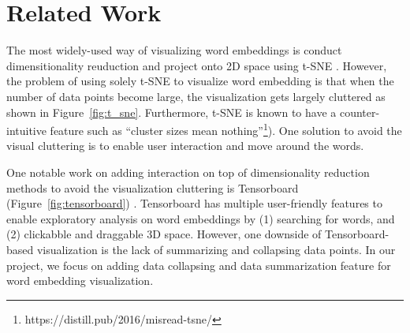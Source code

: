 \section{Related Work}
The most widely-used way of visualizing word embeddings is conduct dimensitionality reuduction and project onto 2D space using t-SNE \cite{t-sne}. 
However, the problem of using solely t-SNE to visualize word embedding is that when the number of data points become large, the visualization gets largely cluttered as shown in Figure~\ref{fig:t_sne}. 
Furthermore, t-SNE is known to have a counter-intuitive feature such as ``cluster sizes mean nothing''\footnote{https://distill.pub/2016/misread-tsne/}). 
One solution to avoid the visual cluttering is to enable user interaction and move around the words. 

One notable work on adding interaction on top of dimensionality reduction methods to avoid the visualization cluttering is Tensorboard (Figure~\ref{fig:tensorboard}) \cite{tensorboard_viz}. 
Tensorboard has multiple user-friendly features to enable exploratory analysis on word embeddings by (1) searching for words, and (2) clickabble and draggable 3D space. 
However, one downside of Tensorboard-based visualization is the lack of summarizing and collapsing data points. 
In our project, we focus on adding data collapsing and data summarization feature for word embedding visualization. 
